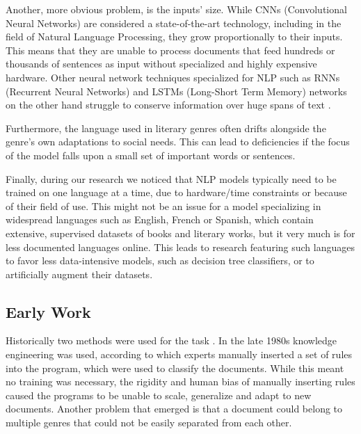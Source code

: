 \documentclass{article}
\begin{document}
	Another, more obvious problem, is the inputs' size. While CNNs (Convolutional Neural Networks) are considered a state-of-the-art technology, including in the field of Natural Language Processing, they grow proportionally to their inputs. This means that they are unable to process documents that feed hundreds or thousands of sentences as input without specialized and highly expensive hardware. Other neural network techniques specialized for NLP such as RNNs (Recurrent Neural Networks) and LSTMs (Long-Short Term Memory) networks on the other hand struggle to conserve information over huge spans of text \cite{worsham_book}. \par
	
	Furthermore, the language used in literary genres often drifts alongside the genre's own adaptations to social needs. This can lead to deficiencies if the focus of the model falls upon a small set of important words or sentences\cite{brazil}. \par
	
	Finally, during our research we noticed that NLP models typically need to be trained on one language at a time, due to hardware/time constraints or because of their field of use. This might not be an issue for a model specializing in widespread languages such as English, French or Spanish, which contain extensive, supervised datasets of books and literary works, but it very much is for less documented languages online. This leads to research featuring such languages to favor less data-intensive models, such as decision tree classifiers\cite{brazil}, or to artificially augment their datasets\cite{geroge}.\par
	
	\subsection{Early Work}
	
	Historically two methods were used for the task \cite{rami}. 
	In the late 1980s knowledge engineering was used, according to which experts manually inserted a set of rules into the program, which were used to classify the documents. While this meant no training was necessary, the rigidity and human bias of manually inserting rules caused the programs to be unable to scale, generalize and adapt to new documents. Another problem that emerged is that a document could belong to multiple genres that could not be easily separated from each other.\par
	
\end{document}
